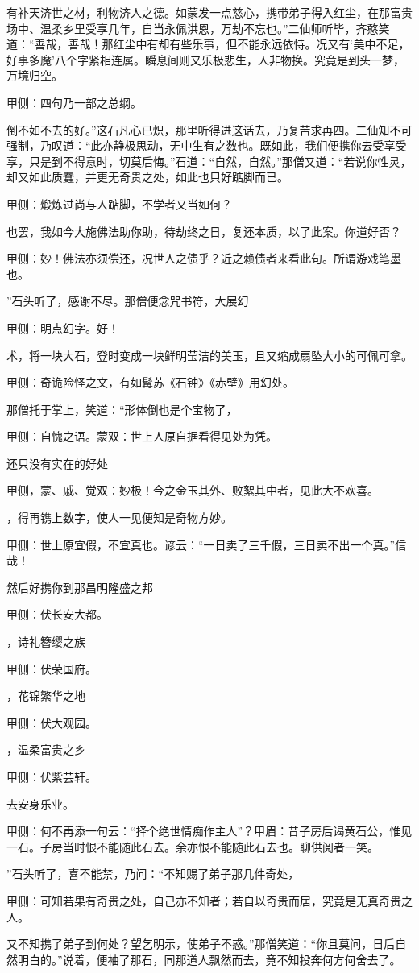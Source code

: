 \begin{parag}
有补天济世之材，利物济人之德。如蒙发一点慈心，携带弟子得入红尘，在那富贵场中、温柔乡里受享几年，自当永佩洪恩，万劫不忘也。”二仙师听毕，齐憨笑道：“善哉，善哉！那红尘中有却有些乐事，但不能永远依恃。况又有‘美中不足，好事多魔’八个字紧相连属。瞬息间则又乐极悲生，人非物换。究竟是到头一梦，万境归空。\begin{note}甲侧：四句乃一部之总纲。\end{note}倒不如不去的好。”这石凡心已炽，那里听得进这话去，乃复苦求再四。二仙知不可强制，乃叹道：“此亦静极思动，无中生有之数也。既如此，我们便携你去受享受享，只是到不得意时，切莫后悔。”石道：“自然，自然。”那僧又道：“若说你性灵，却又如此质蠢，并更无奇贵之处，如此也只好踮脚而已。\begin{note}甲侧：煅炼过尚与人踮脚，不学者又当如何？\end{note}也罢，我如今大施佛法助你助，待劫终之日，复还本质，以了此案。你道好否？\begin{note}甲侧：妙！佛法亦须偿还，况世人之债乎？近之赖债者来看此句。所谓游戏笔墨也。\end{note}”石头听了，感谢不尽。那僧便念咒书符，大展幻\begin{note}甲侧：明点幻字。好！\end{note}术，将一块大石，登时变成一块鲜明莹洁的美玉，且又缩成扇坠大小的可佩可拿。\begin{note}甲侧：奇诡险怪之文，有如髯苏《石钟》《赤壁》用幻处。\end{note}那僧托于掌上，笑道：“形体倒也是个宝物了，\begin{note}甲侧：自愧之语。蒙双：世上人原自据看得见处为凭。\end{note}还只没有实在的好处\begin{note}甲侧，蒙、戚、觉双：妙极！今之金玉其外、败絮其中者，见此大不欢喜。\end{note}，得再镌上数字，使人一见便知是奇物方妙。\begin{note}甲侧：世上原宜假，不宜真也。谚云：“一日卖了三千假，三日卖不出一个真。”信哉！\end{note}然后好携你到那昌明隆盛之邦\begin{note}甲侧：伏长安大都。\end{note}，诗礼簪缨之族\begin{note}甲侧：伏荣国府。\end{note}，花锦繁华之地\begin{note}甲侧：伏大观园。\end{note}，温柔富贵之乡\begin{note}甲侧：伏紫芸轩。\end{note}去安身乐业。\begin{note}甲侧：何不再添一句云：“择个绝世情痴作主人”？甲眉：昔子房后谒黄石公，惟见一石。子房当时恨不能随此石去。余亦恨不能随此石去也。聊供阅者一笑。\end{note}”石头听了，喜不能禁，乃问：“不知赐了弟子那几件奇处，\begin{note}甲侧：可知若果有奇贵之处，自己亦不知者；若自以奇贵而居，究竟是无真奇贵之人。\end{note}又不知携了弟子到何处？望乞明示，使弟子不惑。”那僧笑道：“你且莫问，日后自然明白的。”说着，便袖了那石，同那道人飘然而去，竟不知投奔何方何舍去了。

\end{parag}


